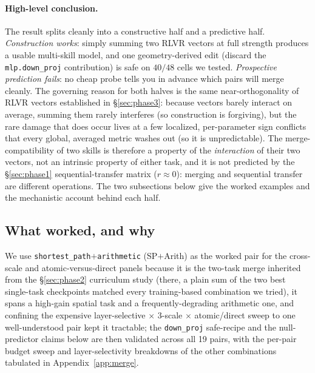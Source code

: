 \documentclass{article}
\begin{document}
\paragraph{High-level conclusion.} The result splits cleanly into a constructive half and a
predictive half. \emph{Construction works}: simply summing two RLVR vectors at full strength
produces a usable multi-skill model, and one geometry-derived edit (discard the
\texttt{mlp.down\_proj} contribution) is safe on $40/48$ cells we tested. \emph{Prospective
prediction fails}: no cheap probe tells you in advance which pairs will merge cleanly. The
governing reason for both halves is the same near-orthogonality of RLVR vectors established in
\S\ref{sec:phase3}: because vectors barely interact on average, summing them rarely interferes
(so construction is forgiving), but the rare damage that does occur lives at a few localized,
per-parameter sign conflicts that every global, averaged metric washes out (so it is
unpredictable). The merge-compatibility of two skills is therefore a property of the
\emph{interaction} of their two vectors, not an intrinsic property of either task, and it is not
predicted by the \S\ref{sec:phase1} sequential-transfer matrix ($r\approx 0$): merging and
sequential transfer are different operations. The two subsections below give the worked examples
and the mechanistic account behind each half.

\subsection{What worked, and why}

We use \texttt{shortest\_path}$+$\texttt{arithmetic} (SP$+$Arith) as the worked pair for the
cross-scale and atomic-versus-direct panels because it is the two-task merge inherited from the
\S\ref{sec:phase2} curriculum study (there, a plain sum of the two best single-task checkpoints
matched every training-based combination we tried), it spans a high-gain spatial task and a
frequently-degrading arithmetic one, and confining the expensive layer-selective $\times$
3-scale $\times$ atomic/direct sweep to one well-understood pair kept it tractable; the
\texttt{down\_proj} safe-recipe and the null-predictor claims below are then validated across all
19 pairs, with the per-pair budget sweep and layer-selectivity breakdowns of the other
combinations tabulated in Appendix~\ref{app:merge}.
\end{document}
